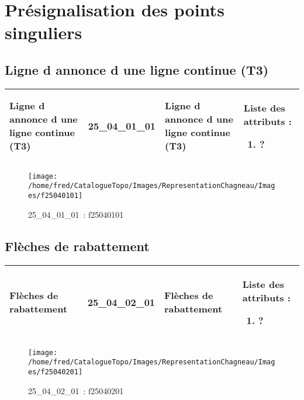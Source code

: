 \documentclass[12pt,titlepage]{book}
\begin{document}
\section{\large Présignalisation des points singuliers}
\subsection{Ligne d annonce d une ligne continue (T3)}
\noindent
\vspace{\baselineskip}

\renewcommand{\arraystretch}{1.2}
\begin{supertabular}{|p{10cm}|c|p{13cm}|p{12cm}|}
 Ligne d annonce d une ligne continue (T3) & 25\_04\_01\_01 & Ligne d annonce d une ligne continue (T3) & Liste des attributs :
\begin{enumerate}
  \item ?\end{enumerate}
\\
\hline
\end{supertabular}
\begin{figure}[h!]
  \hfill         %
  \begin{minipage}[t]{3cm}
    \begin{center}
      \texttt{[image: /home/fred/CatalogueTopo/Images/RepresentationChagneau/Images/f25040101]}
      \caption[~25\_04\_01\_01]{\small{25\_04\_01\_01~:} \tiny{f25040101}}\label{f25040101}
    \end{center}
  \end{minipage}
\end{figure}


\subsection{Flèches de rabattement}
\noindent
\vspace{\baselineskip}

\renewcommand{\arraystretch}{1.2}
\begin{supertabular}{|p{10cm}|c|p{13cm}|p{12cm}|}
 Flèches de rabattement & 25\_04\_02\_01 & Flèches de rabattement & Liste des attributs :
\begin{enumerate}
  \item ?\end{enumerate}
\\
\hline
\end{supertabular}
\begin{figure}[h!]
  \hfill         %
  \begin{minipage}[t]{3cm}
    \begin{center}
      \texttt{[image: /home/fred/CatalogueTopo/Images/RepresentationChagneau/Images/f25040201]}
      \caption[~25\_04\_02\_01]{\small{25\_04\_02\_01~:} \tiny{f25040201}}\label{f25040201}
    \end{center}
  \end{minipage}
\end{figure}
\end{document}
